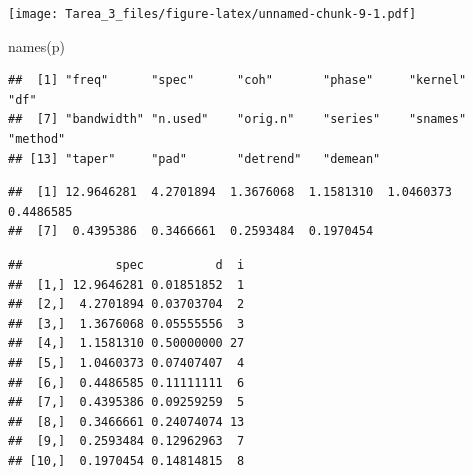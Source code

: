 \documentclass[
]{article}
\newenvironment{Shaded}{\begin{snugshade}}{\end{snugshade}}
\newcommand{\AttributeTok}[1]{\textcolor[rgb]{0.77,0.63,0.00}{#1}}
\newcommand{\CommentTok}[1]{\textcolor[rgb]{0.56,0.35,0.01}{\textit{#1}}}
\newcommand{\ConstantTok}[1]{\textcolor[rgb]{0.00,0.00,0.00}{#1}}
\newcommand{\DecValTok}[1]{\textcolor[rgb]{0.00,0.00,0.81}{#1}}
\newcommand{\FunctionTok}[1]{\textcolor[rgb]{0.00,0.00,0.00}{#1}}
\newcommand{\NormalTok}[1]{#1}
\newcommand{\OtherTok}[1]{\textcolor[rgb]{0.56,0.35,0.01}{#1}}
\newcommand{\SpecialCharTok}[1]{\textcolor[rgb]{0.00,0.00,0.00}{#1}}
\begin{document}
\texttt{[image: Tarea\_3\_files/figure-latex/unnamed-chunk-9-1.pdf]}

\begin{Shaded}
\begin{Highlighting}[]
\FunctionTok{names}\NormalTok{(p)}
\end{Highlighting}
\end{Shaded}

\begin{verbatim}
##  [1] "freq"      "spec"      "coh"       "phase"     "kernel"    "df"       
##  [7] "bandwidth" "n.used"    "orig.n"    "series"    "snames"    "method"   
## [13] "taper"     "pad"       "detrend"   "demean"
\end{verbatim}

\begin{Shaded}
\end{Shaded}

\begin{verbatim}
##  [1] 12.9646281  4.2701894  1.3676068  1.1581310  1.0460373  0.4486585
##  [7]  0.4395386  0.3466661  0.2593484  0.1970454
\end{verbatim}

\begin{Shaded}
\end{Shaded}

\begin{verbatim}
##             spec          d  i
##  [1,] 12.9646281 0.01851852  1
##  [2,]  4.2701894 0.03703704  2
##  [3,]  1.3676068 0.05555556  3
##  [4,]  1.1581310 0.50000000 27
##  [5,]  1.0460373 0.07407407  4
##  [6,]  0.4486585 0.11111111  6
##  [7,]  0.4395386 0.09259259  5
##  [8,]  0.3466661 0.24074074 13
##  [9,]  0.2593484 0.12962963  7
## [10,]  0.1970454 0.14814815  8
\end{verbatim}
\end{document}
